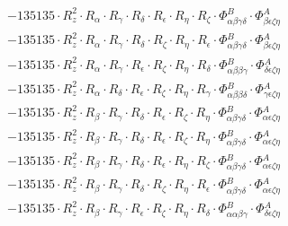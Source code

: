 \documentclass{article}
\begin{document}
\begin{subequations}
\begin{gather}
\begin{array}{c}
 \\[0.2em] 		 - 135135 \cdot R_{z}^{2} \cdot R_{\alpha{}} \cdot R_{\gamma{}} \cdot R_{\delta{}} \cdot R_{\epsilon{}} \cdot R_{\eta{}} \cdot R_{\zeta{}} \cdot \Phi{}^{B}_{\alpha{}\beta{}\gamma{}\delta{}} \cdot \Phi{}^{A}_{\beta{}\epsilon{}\zeta{}\eta{}} 
 \\[0.2em] 		 - 135135 \cdot R_{z}^{2} \cdot R_{\alpha{}} \cdot R_{\gamma{}} \cdot R_{\delta{}} \cdot R_{\zeta{}} \cdot R_{\eta{}} \cdot R_{\epsilon{}} \cdot \Phi{}^{B}_{\alpha{}\beta{}\gamma{}\delta{}} \cdot \Phi{}^{A}_{\beta{}\epsilon{}\zeta{}\eta{}} 
 \\[0.2em] 		 - 135135 \cdot R_{z}^{2} \cdot R_{\alpha{}} \cdot R_{\gamma{}} \cdot R_{\epsilon{}} \cdot R_{\zeta{}} \cdot R_{\eta{}} \cdot R_{\delta{}} \cdot \Phi{}^{B}_{\alpha{}\beta{}\beta{}\gamma{}} \cdot \Phi{}^{A}_{\delta{}\epsilon{}\zeta{}\eta{}} 
 \\[0.2em] 		 - 135135 \cdot R_{z}^{2} \cdot R_{\alpha{}} \cdot R_{\delta{}} \cdot R_{\epsilon{}} \cdot R_{\zeta{}} \cdot R_{\eta{}} \cdot R_{\gamma{}} \cdot \Phi{}^{B}_{\alpha{}\beta{}\beta{}\delta{}} \cdot \Phi{}^{A}_{\gamma{}\epsilon{}\zeta{}\eta{}} 
 \\[0.2em] 		 - 135135 \cdot R_{z}^{2} \cdot R_{\beta{}} \cdot R_{\gamma{}} \cdot R_{\delta{}} \cdot R_{\epsilon{}} \cdot R_{\zeta{}} \cdot R_{\eta{}} \cdot \Phi{}^{B}_{\alpha{}\beta{}\gamma{}\delta{}} \cdot \Phi{}^{A}_{\alpha{}\epsilon{}\zeta{}\eta{}} 
 \\[0.2em] 		 - 135135 \cdot R_{z}^{2} \cdot R_{\beta{}} \cdot R_{\gamma{}} \cdot R_{\delta{}} \cdot R_{\epsilon{}} \cdot R_{\zeta{}} \cdot R_{\eta{}} \cdot \Phi{}^{B}_{\alpha{}\beta{}\gamma{}\delta{}} \cdot \Phi{}^{A}_{\alpha{}\epsilon{}\zeta{}\eta{}} 
 \\[0.2em] 		 - 135135 \cdot R_{z}^{2} \cdot R_{\beta{}} \cdot R_{\gamma{}} \cdot R_{\delta{}} \cdot R_{\epsilon{}} \cdot R_{\eta{}} \cdot R_{\zeta{}} \cdot \Phi{}^{B}_{\alpha{}\beta{}\gamma{}\delta{}} \cdot \Phi{}^{A}_{\alpha{}\epsilon{}\zeta{}\eta{}} 
 \\[0.2em] 		 - 135135 \cdot R_{z}^{2} \cdot R_{\beta{}} \cdot R_{\gamma{}} \cdot R_{\delta{}} \cdot R_{\zeta{}} \cdot R_{\eta{}} \cdot R_{\epsilon{}} \cdot \Phi{}^{B}_{\alpha{}\beta{}\gamma{}\delta{}} \cdot \Phi{}^{A}_{\alpha{}\epsilon{}\zeta{}\eta{}} 
 \\[0.2em] 		 - 135135 \cdot R_{z}^{2} \cdot R_{\beta{}} \cdot R_{\gamma{}} \cdot R_{\epsilon{}} \cdot R_{\zeta{}} \cdot R_{\eta{}} \cdot R_{\delta{}} \cdot \Phi{}^{B}_{\alpha{}\alpha{}\beta{}\gamma{}} \cdot \Phi{}^{A}_{\delta{}\epsilon{}\zeta{}\eta{}} 

\end{array}
\end{gather}
\end{subequations}
\end{document}
